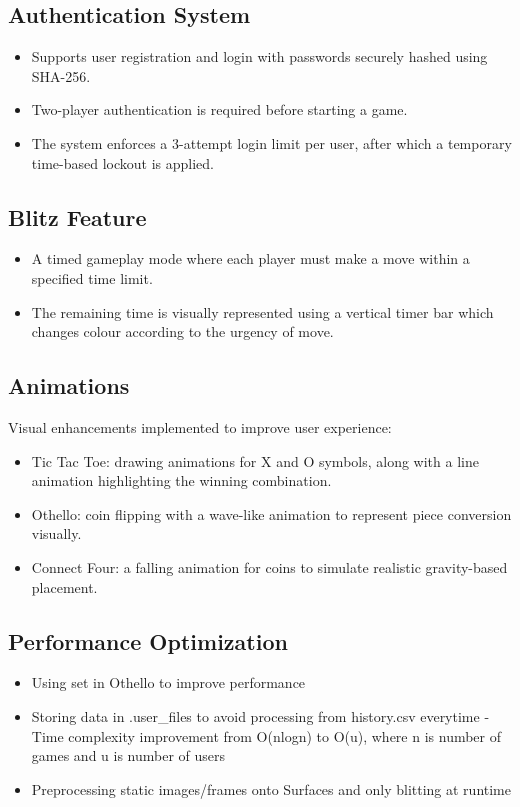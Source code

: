 \documentclass[12pt]{article}
\begin{document}
    \subsection{Authentication System}
    \begin{itemize}
        \item Supports user registration and login with passwords securely hashed using SHA-256.
        \item Two-player authentication is required before starting a game.
        \item The system enforces a 3-attempt login limit per user, after which a temporary time-based lockout is applied.
    \end{itemize}
    
    \subsection{Blitz Feature}
    \begin{itemize}
        \item A timed gameplay mode where each player must make a move within a specified time limit.
        \item The remaining time is visually represented using a vertical timer bar which changes colour according to the urgency of move.
    \end{itemize}


    \subsection{Animations} Visual enhancements implemented to improve user experience:
    \begin{itemize}
        \item Tic Tac Toe: drawing animations for X and O symbols, along with a line animation highlighting the winning combination.
        \item Othello: coin flipping with a wave-like animation to represent piece conversion visually.
        \item Connect Four: a falling animation for coins to simulate realistic gravity-based placement.
    \end{itemize}

	\subsection{Performance Optimization}
	\begin{itemize}
        \item Using set in Othello to improve performance
		\item Storing data in .user\_files to avoid processing from history.csv everytime - Time complexity improvement from O(nlogn) to O(u), where n is number of games and u is number of users
		\item Preprocessing static images/frames onto Surfaces and only blitting at runtime
    \end{itemize}
\end{document}
